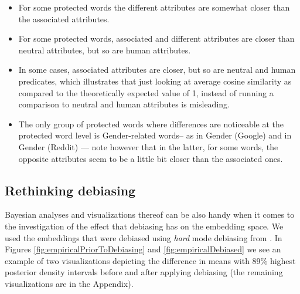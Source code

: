 \documentclass{clv3}
\begin{document}
\begin{itemize}
\item
  For some protected words the different attributes are somewhat closer
  than the associated attributes.
\item
  For some protected words, associated and different attributes are
  closer than neutral attributes, but so are human attributes.
\item
  In some cases, associated attributes are closer, but so are neutral
  and human predicates, which illustrates that just looking at average
  cosine similarity as compared to the theoretically expected value of
  1, instead of running a comparison to neutral and human attributes is
  misleading.
\item
  The only group of protected words where differences are noticeable at
  the protected word level is Gender-related words-- as in Gender
  (Google) and in Gender (Reddit) --- note however that in the latter,
  for some words, the opposite attributes seem to be a little bit closer
  than the associated ones.
\end{itemize}











\hypertarget{rethinking-debiasing}{%
\subsection{Rethinking debiasing}\label{rethinking-debiasing}}

\label{subsec:rethinking}

Bayesian analyses and visualizations thereof can be also handy when it
comes to the investigation of the effect that debiasing has on the
embedding space. We used the embeddings that were debiased using \textit{hard} mode debiasing from \citet{Manzini2019blackToCriminal}. In Figures \ref{fig:empiricalPriorToDebiasing} and
\ref{fig:empiricalDebiased} we see an example of two visualizations
depicting the difference in means with 89\% highest posterior density
intervals before and after applying debiasing (the remaining
visualizations are in the Appendix).
\end{document}
